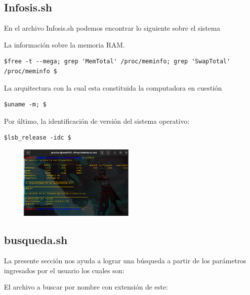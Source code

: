 \documentclass[letterpaper,12pt]{article} %
\begin{document}

\subsection{Infosis.sh}

En el archivo Infosis.sh podemos encontrar lo siguiente sobre el sistema

La información sobre la memoria RAM.

\begin{verbatim}
$free -t --mega; grep 'MemTotal' /proc/meminfo; grep 'SwapTotal' /proc/meminfo $
\end{verbatim}

La arquitectura con la cual esta constituida la computadora en cuestión

\begin{verbatim}
$uname -m; $
\end{verbatim}
    Por último, la identificación de versión del sistema operativo:

\begin{verbatim}
$lsb_release -idc $
\end{verbatim}

\begin{figure}[H]
    \centering
    \includegraphics[width=0.5\textwidth]{figurasShell/InfoSis.png}
\end{figure}

\subsection{busqueda.sh}
La presente sección nos ayuda a lograr una búsqueda a partir de los parámetros ingresados por el usuario los cuales son:

El archivo a buscar por nombre con extensión de este:
\end{document}

